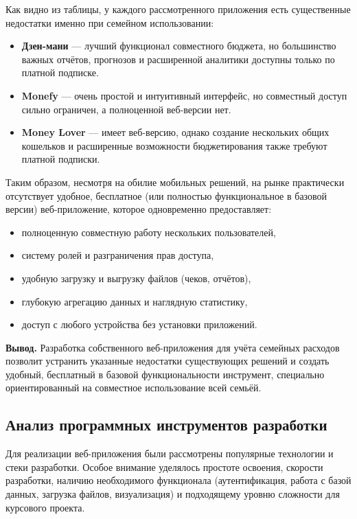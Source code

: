 Как видно из таблицы, у каждого рассмотренного приложения есть существенные недостатки именно при семейном использовании:

\begin{itemize}
    \item \textbf{Дзен-мани} — лучший функционал совместного бюджета, но большинство важных отчётов, прогнозов и расширенной аналитики доступны только по платной подписке.
    \item \textbf{Monefy} — очень простой и интуитивный интерфейс, но совместный доступ сильно ограничен, а полноценной веб-версии нет.
    \item \textbf{Money Lover} — имеет веб-версию, однако создание нескольких общих кошельков и расширенные возможности бюджетирования также требуют платной подписки.
\end{itemize}

Таким образом, несмотря на обилие мобильных решений, на рынке практически отсутствует удобное, бесплатное (или полностью функциональное в базовой версии) веб-приложение, которое одновременно предоставляет:

\begin{itemize}
    \item полноценную совместную работу нескольких пользователей,
    \item систему ролей и разграничения прав доступа,
    \item удобную загрузку и выгрузку файлов (чеков, отчётов),
    \item глубокую агрегацию данных и наглядную статистику,
    \item доступ с любого устройства без установки приложений.
\end{itemize}

\textbf{Вывод.} Разработка собственного веб-приложения для учёта семейных расходов позволит устранить указанные недостатки существующих решений и создать удобный, бесплатный в базовой функциональности инструмент, специально ориентированный на совместное использование всей семьёй.


\subsection{Анализ программных инструментов разработки}

Для реализации веб-приложения были рассмотрены популярные технологии и стеки разработки. Особое внимание уделялось простоте освоения, скорости разработки, наличию необходимого функционала (аутентификация, работа с базой данных, загрузка файлов, визуализация) и подходящему уровню сложности для курсового проекта.

